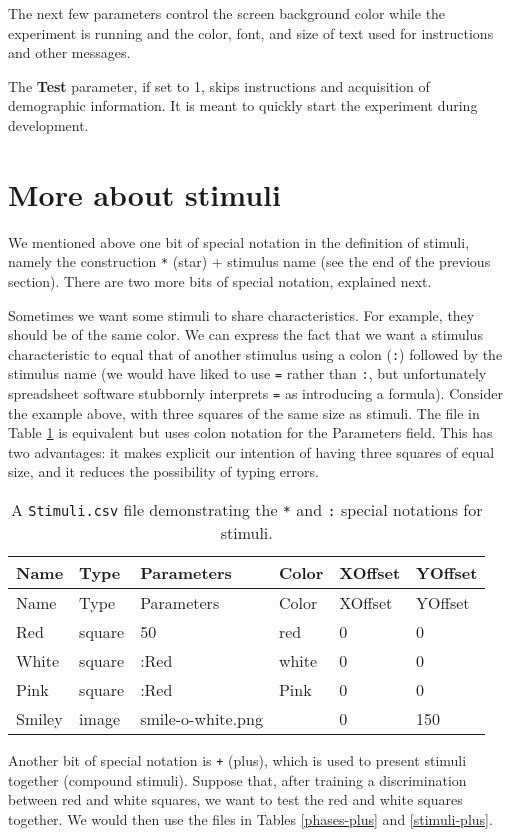 \documentclass[11pt,]{article}
\begin{document}
The next few parameters control the screen background color while the
experiment is running and the color, font, and size of text used for
instructions and other messages.

The \textbf{Test} parameter, if set to 1, skips instructions and
acquisition of demographic information. It is meant to quickly start the
experiment during development.

\section{More about stimuli}\label{more-about-stimuli}

We mentioned above one bit of special notation in the definition of
stimuli, namely the construction \texttt{*} (star) + stimulus name (see
the end of the previous section). There are two more bits of special
notation, explained next.

Sometimes we want some stimuli to share characteristics. For example,
they should be of the same color. We can express the fact that we want a
stimulus characteristic to equal that of another stimulus using a colon
(\texttt{:}) followed by the stimulus name (we would have liked to use
\texttt{=} rather than \texttt{:}, but unfortunately spreadsheet
software stubbornly interprets \texttt{=} as introducing a formula).
Consider the example above, with three squares of the same size as
stimuli. The file in Table \ref{stimuli-special} is equivalent but uses
colon notation for the Parameters field. This has two advantages: it
makes explicit our intention of having three squares of equal size, and
it reduces the possibility of typing errors.

\begin{longtable}[c]{@{}llllll@{}}
\caption{A \texttt{Stimuli.csv} file demonstrating the \texttt{*} and
\texttt{:} special notations for stimuli.
\label{stimuli-special}}\tabularnewline
\toprule
Name & Type & Parameters & Color & XOffset & YOffset\tabularnewline
\midrule
\endfirsthead
\toprule
Name & Type & Parameters & Color & XOffset & YOffset\tabularnewline
\midrule
\endhead
Red & square & 50 & red & 0 & 0\tabularnewline
White & square & :Red & white & 0 & 0\tabularnewline
Pink & square & :Red & Pink & 0 & 0\tabularnewline
Smiley & image & smile-o-white.png & & 0 & 150\tabularnewline
\bottomrule
\end{longtable}

Another bit of special notation is \texttt{+} (plus), which is used to
present stimuli together (compound stimuli). Suppose that, after
training a discrimination between red and white squares, we want to test
the red and white squares together. We would then use the files in
Tables \ref{phases-plus} and \ref{stimuli-plus}.
\end{document}
